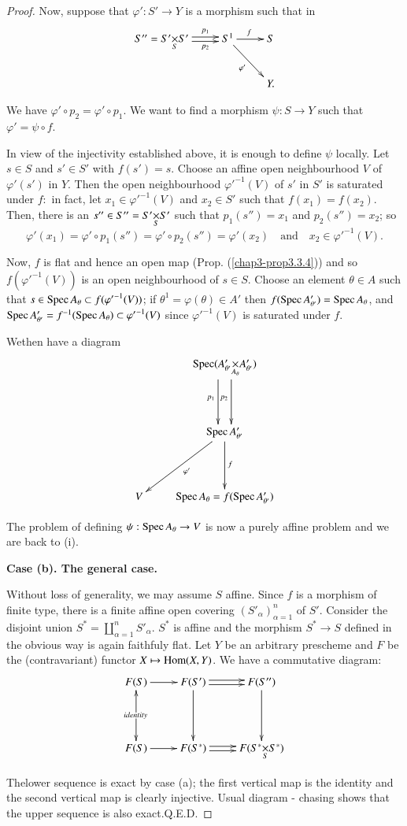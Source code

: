 \begin{proof}
Now, suppose that $\varphi':S'\to Y$ is a morphism such that in\pageoriginale
\[
\xymatrix{
S''=\fprod{S'}{S'}{S}\ar@<.2em>[r]^-{p_{1}}\ar@<-.2em>[r]_-{p_{2}} &
S^{1}\ar[dr]_{\varphi'}\ar[r]^{f} & S\\
& &  Y.
}
\]

We have $\varphi'\circ p_{2}=\varphi'\circ p_{1}$. We want to find a
morphism $\psi:S\to Y$ such that $\varphi'=\psi\circ f$.

In view of the injectivity established above, it is enough to define
$\psi$ locally. Let $s\in S$ and $s'\in S'$ with $f(s')=s$. Choose an
affine open neighbourhood $V$ of $\varphi'(s')$ in $Y$. Then the open
neighbourhood ${\varphi'}^{-1}(V)$ of $s'$ in $S'$ is saturated under
$f:$ in fact, let $x_{1}\in {\varphi'}^{-1}(V)$ and $x_{2}\in S'$ such
that $f(x_{1})=f(x_{2})$. Then, there is an $s''\in
S''=\fprod{S'}{S'}{S}$ such that $p_{1}(s'')=x_{1}$ and
$p_{2}(s'')=x_{2}$; so
$$
\varphi'(x_{1})=\varphi'\circ p_{1}(s'')=\varphi'\circ
p_{2}(s'')=\varphi'(x_{2})\quad\text{and}\quad x_{2}\in {\varphi'}^{-1}(V).
$$

Now, $f$ is flat and hence an open map (Prop. (\ref{chap3-prop3.3.4})) and
so\break $f({\varphi'}^{-1}(V))$ is an open neighbourhood of $s\in
S$. Choose an element $\theta\in A$ such that $s\in \operatorname{Spec}
A_{\theta}\subset f({\varphi'}^{-1}(V))$; if
$\theta^{1}=\varphi(\theta)\in A'$ then $f(\operatorname{Spec} A'_{\theta'})=\operatorname{Spec}
A_{\theta}$, and $\operatorname{Spec} A'_{\theta'}=f^{-1}(\operatorname{Spec} A_{\theta})\subset
{\varphi'}^{-1}(V)$ since ${\varphi'}^{-1}(V)$ is saturated under $f$.

We\pageoriginale then have a diagram
\[
\xymatrix@R=1.5cm{
 &
  \Spec(\fprod{A'_{\theta'}}{A'_{\theta'}}{A_{\theta}})\ar@<.6em>[d]_{p_{2}}\ar@<-.6em>_{p_{1}}[d]\\
& \Spec A'_{\theta'}\ar[dl]^{\varphi'}\ar[d]^{f}\\
V & \Spec A_{\theta}=f(\Spec A'_{\theta'})
}
\]

The problem of defining $\psi:\operatorname{Spec} A_{\theta}\to V$ is now a purely
affine problem and we are back to (i).

\medskip
{\bf Case (b). The general case.}
\smallskip

Without loss of generality, we may assume $S$ affine. Since $f$ is a
morphism of finite type, there is a finite affine open covering
$(S'_{\alpha})^{n}_{\alpha=1}$ of $S'$. Consider the disjoint union
$S^{\ast}=\coprod^{n}_{\alpha=1}S'_{\alpha}$. $S^{\ast}$ is affine and
the morphism $S^{\ast}\to S$ defined in the obvious way is again
faithfuly flat. Let $Y$ be an arbitrary prescheme and $F$ be the
(contravariant) functor $X\mapsto \operatorname{Hom}(X,Y)$. We have a commutative
diagram:
\[
\xymatrix@R=1.5cm{
F(S)\ar@{<->}[d]|\hole^{\kern -.5cm identity} \ar[r] & F(S')\ar@<.2em>[r]\ar@<-.2em>[r]\ar[d] &
F(S'')\ar[d]\\
F(S) \ar[r] & F(S^{\ast})\ar@<.2em>[r]\ar@<-.2em>[r] &
F(\fprod{S^{\ast}}{S^{\ast}}{S}) 
}
\] 

The\pageoriginale lower sequence is exact by case (a); the first
vertical map is the identity and the second vertical map is clearly
injective. Usual diagram - chasing shows that the upper sequence is
also exact.\hfill Q.E.D.
\end{proof}

